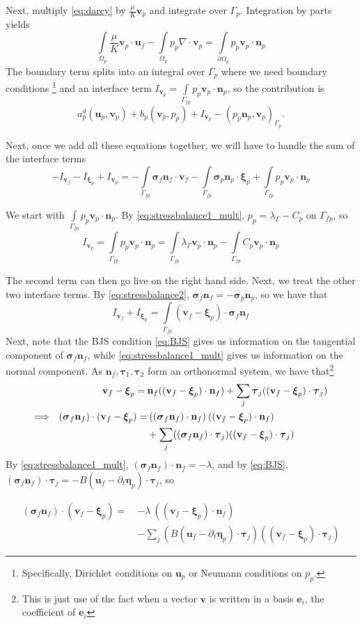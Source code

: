 \documentclass{article}
\newcommand{\mathspace}[1]{\ensuremath{#1}\xspace} %
\newcommand{\sigmabf}{\mathspace{\boldsymbol{\sigma}}}
\renewcommand{\div}{\mathspace{\nabla \cdot}}
\newcommand{\ddt}[1]{\mathspace{\partial_t #1}}
\newcommand{\taubf}{\mathspace{\boldsymbol{\tau}}}
\newcommand{\darcy}{\mathspace{\Omega_{p}}}
\newcommand{\darcybdy}{\mathspace{\Gamma_{p}}}
\newcommand{\interface}{\mathspace{\Gamma_{fp}}}
\newcommand{\nf}{\mathspace{\mathbf{n}_f}}
\newcommand{\np}{\mathspace{\mathbf{n}_p}}
\newcommand{\intD}{\mathspace{\int \limits_{\darcy}}}
\newcommand{\intDbdyI}{\mathspace{\int \limits_{\partial \darcy}}}
\newcommand{\intI}{\mathspace{\int \limits_{\interface}}}
\newcommand{\uf}{\mathspace{\mathbf{u}_f}}
\newcommand{\vf}{\mathspace{\mathbf{v}_f}}
\newcommand{\up}{\mathspace{\mathbf{u}_p}}
\newcommand{\vp}{\mathspace{\mathbf{v}_p}}
\newcommand{\pp}{\mathspace{p_p}}
\newcommand{\disp}{\mathspace{\boldsymbol{\eta}_p}}
\newcommand{\disptest}{\mathspace{\boldsymbol{\xi}_p}}
\newcommand{\mult}{\mathspace{\lambda_{\Gamma}}}
\begin{document}
Next, multiply \eqref{eq:darcy} by $\frac {\mu} {K} \vp$ and integrate over \darcybdy. Integration by parts yields
$$ \intD \frac {\mu} {K} \vp \cdot \uf -  \intD \pp \div \vp = \intDbdyI \pp \vp \cdot \np$$ 
The boundary term splits into an integral over \darcybdy where we need boundary conditions \footnote{Specifically, Dirichlet conditions on \up or Neumann conditions on \pp.} and an interface term $I_{\vp} = \intI \pp \vp \cdot \np$, so the contribution is
$$a_p^d(\up, \vp) + b_p(\vp, \pp) + I_{\vp} - (\pp \np, \vp)_{\darcybdy}.$$

Next, once we add all these equations together, we will have to handle the sum of the interface terms $$-I_{\vf} - I_{\disptest} + I_{\vp} = -\intI \sigmabf_f \nf \cdot \vf -\intI \sigmabf_p \np \cdot \disptest + \intI \pp \vp \cdot \np$$

We start with $\intI \pp \vp \cdot \np$. By \eqref{eq:stressbalance1_mult}, $\pp = \mult - C_p$ on \interface, so
$$I_{\vp} = \intI \pp \vp \cdot \np = \intI \mult \vp \cdot \np - \intI C_p \vp \cdot \np$$

The second term can then go live on the right hand side. Next, we treat the other two interface terms. By \eqref{eq:stressbalance2}, $\sigmabf_f \nf = - \sigmabf_p \np$, so we have that $$I_{\vf} + I_{\disptest} = \intI (\vf - \disptest) \cdot \sigmabf_f \nf$$
Next, note that the BJS condition \eqref{eq:BJS} gives us information on the tangential component of $\sigmabf_f \nf$, while \eqref{eq:stressbalance1_mult} gives us information on the normal component. As $\nf, \taubf_1, \taubf_2$ form an orthonormal system, we have that\footnote{This is just use of the fact when a vector $\mathbf{v}$ is written in a basis $\mathbf{e}_i$, the coefficient of $\mathbf{e}_i$    }
\begin{align*}
  \vf - \disptest = \: &\nf ((\vf - \disptest) \cdot \nf) + \sum_j \taubf_j ((\vf - \disptest) \cdot \taubf_j) \\
  \Longrightarrow \hspace{0.02\textwidth}  (\sigmabf_f \nf) \cdot (\vf - \disptest) = & \: ((\sigmabf_f \nf) \cdot \nf) \: ((\vf - \disptest) \cdot \nf) \\
  & + \sum_j ((\sigmabf_f \nf) \cdot \taubf_j) ((\vf - \disptest) \cdot \taubf_j)
\end{align*}
By \eqref{eq:stressbalance1_mult}, $(\sigmabf_f \nf) \cdot \nf = -\lambda$, and by \eqref{eq:BJS}, $(\sigmabf_f \nf) \cdot \taubf_j = -B \left ( \uf - \ddt{\disp} \right ) \cdot \taubf_j$, so

\begin{align*}
(\sigmabf_f \nf) \cdot (\vf - \disptest) =  \: &-\lambda\:  ((\vf - \disptest) \cdot \nf) \\
  &- \sum_j \left (B \left ( \uf - \ddt{\disp} \right ) \cdot \taubf_j \right ) ((\vf - \disptest) \cdot \taubf_j)
\end{align*}
\end{document}
